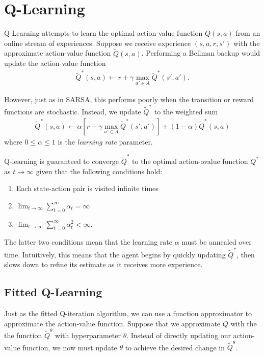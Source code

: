 \documentclass[11pt]{article}
\numberwithin{equation}{section}
\numberwithin{figure}{section}
\begin{document}
\section{Q-Learning}
Q-Learning attempts to learn the optimal action-value function $Q(s, a)$ from
an online stream of experiences. Suppose we receive experience $(s, a, r, s')$
with the approximate action-value function $\tilde{Q}(s, a)$. Performing a
Bellman backup would update the action-value function
\begin{align*}
    \tilde{Q}^*(s, a) \gets r + \gamma \max_{a' \in A} \tilde{Q}^*(s', a').
\end{align*}

However, just as in SARSA, this performs poorly when the transition or reward
functions are stochastic. Instead, we update $\tilde{Q}^*$ to the weighted sum
\begin{align*}
    \tilde{Q}^*(s, a) \gets \alpha \left[r + \gamma \max_{a' \in A} \tilde{Q}^*(s', a')\right]
                            + (1 - \alpha) \tilde{Q}^*(s, a)
\end{align*}
where $0 \le \alpha \le 1$ is the \emph{learning rate} parameter.

Q-learning is guaranteed to converge $\tilde{Q}^*$ to the optimal action-ovalue
function $Q^*$ as $t \to \infty$ given that the following conditions hold:
\begin{enumerate}
    \item Each state-action pair is visited infinite times
    \item $\lim_{t \to \infty} \sum_{t = 0}^\infty \alpha_t = \infty$
    \item $\lim_{t \to \infty} \sum_{t = 0}^\infty \alpha_t^2 < \infty$.
\end{enumerate}
The latter two conditions mean that the learning rate $\alpha$ must be annealed
over time. Intuitively, this means that the agent begins by quickly updating
$\tilde{Q}^*$, then slows down to refine its estimate as it receives more
experience.

\subsection{Fitted Q-Learning}
Just as the fitted Q-iteration algorithm, we can use a function approximator to
approximate the action-value function. Suppose that we approximate $Q$ with the
the function $\tilde{Q}^\theta$ with hyperparameter $\theta$. Instead of
directly updating our action-value function, we now must update $\theta$ to
achieve the desired change in $\tilde{Q}^\theta$.
\end{document}
